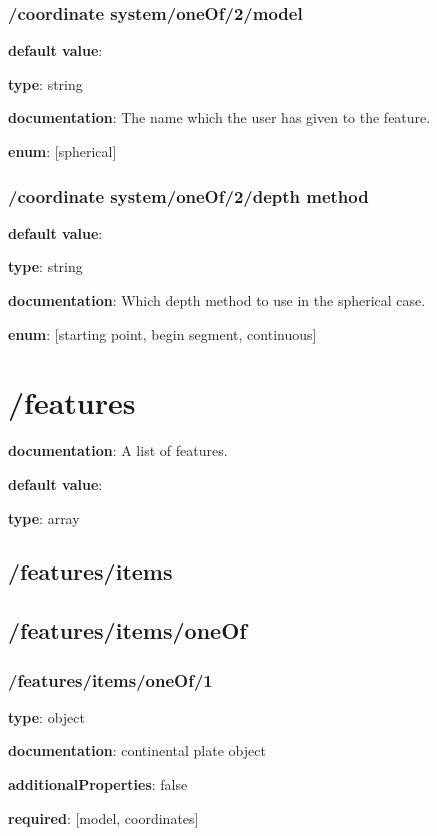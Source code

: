 \subsubsection{/coordinate system/oneOf/2/model} \begin{itemized}
\item {\bf default value}: 
\item {\bf type}: string
\item {\bf documentation}: The name which the user has given to the feature.
\item {\bf enum}: [spherical]\end{itemized}\subsubsection{/coordinate system/oneOf/2/depth method} \begin{itemized}
\item {\bf default value}: 
\item {\bf type}: string
\item {\bf documentation}: Which depth method to use in the spherical case.
\item {\bf enum}: [starting point, begin segment, continuous]\end{itemized}\section{/features} \begin{itemized}
\item {\bf documentation}: A list of features.
\item {\bf default value}: 
\item {\bf type}: array
\subsection{/features/items} \begin{itemized}
\end{itemized}\end{itemized}\subsection{/features/items/oneOf} \begin{itemized}
\end{itemized}\subsubsection{/features/items/oneOf/1} \begin{itemized}
\item {\bf type}: object
\item {\bf documentation}: continental plate object
\item {\bf additionalProperties}: false
\item {\bf required}: [model, coordinates]\end{itemized}
